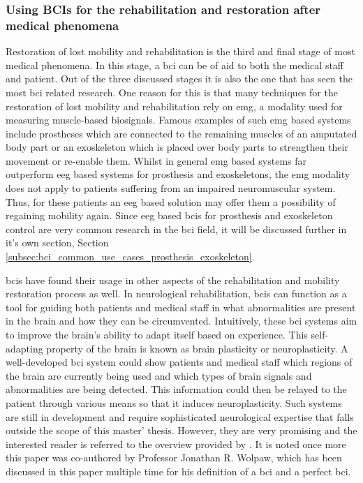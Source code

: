 
\subsubsection{Using BCIs for the rehabilitation and restoration after medical phenomena}
\label{subsubsec:bci_common_use_cases_medical_phenomena_restoration}

Restoration of lost mobility and rehabilitation is the third and final stage of most medical phenomena.
In this stage, a \gls{bci} can be of aid to both the medical staff and patient.
Out of the three discussed stages it is also the one that has seen the most \gls{bci} related research.
One reason for this is that many techniques for the restoration of lost mobility and rehabilitation rely on \gls{emg}, a modality used for measuring muscle-based \glspl{biosignal}.
Famous examples of such \gls{emg} based systems include prostheses which are connected to the remaining muscles of an amputated body part or an exoskeleton which is placed over body parts to strengthen their movement or re-enable them. 
Whilst in general \gls{emg} based systems far outperform \gls{eeg} based systems for prosthesis and exoskeletons, the \gls{emg} modality does not apply to patients suffering from an impaired neuromuscular system.
Thus, for these patients an \gls{eeg} based solution may offer them a possibility of regaining mobility again.
Since \gls{eeg} based \glspl{bci} for prosthesis and exoskeleton control are very common research in the \gls{bci} field, it will be discussed further in it's own section, Section \ref{subsec:bci_common_use_cases_prosthesis_exoskeleton}.

\Glspl{bci} have found their usage in other aspects of the rehabilitation and mobility restoration process as well.
In neurological rehabilitation, \glspl{bci} can function as a tool for guiding both patients and medical staff in what abnormalities are present in the brain and how they can be circumvented.
Intuitively, these \gls{bci} systems aim to improve the brain's ability to adapt itself based on experience.
This self-adapting property of the brain is known as brain plasticity or neuroplasticity.
A well-developed \gls{bci} system could show patients and medical staff which regions of the brain are currently being used and which types of brain signals and abnormalities are being detected.
This information could then be relayed to the patient through various means so that it induces neuroplasticity.
Such systems are still in development and require sophisticated neurological expertise that falls outside the scope of this master' thesis.
However, they are very promising and the interested reader is referred to the overview provided by \citet{bci_rehabilitation}.
It is noted once more this paper was co-authored by Professor Jonathan R. Wolpaw, which has been discussed in this paper multiple time for his definition of a \gls{bci} and a perfect \gls{bci}.

